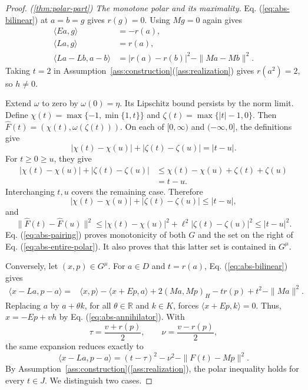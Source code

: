 \documentclass[11pt]{article}
\newcommand{\R}{\mathbb R}
\newcommand{\pair}[2]{\langle #1,#2\rangle}
\theoremstyle{definition}
\theoremstyle{remark}
\begin{document}
\begin{proof}
\noindent\textit{\textup{(\ref{thm:polar-part})} The monotone polar and its maximality.}
Eq. (\ref{eq:abs-bilinear}) at $a=b=g$ gives $r(g)=0$. Using $Mg=0$ again gives
\begin{equation}
\begin{aligned}
\pair{Ea}{g}&=-r(a),\\
\pair{La}{g}&=r(a),\\
\pair{La-Lb}{a-b}&=|r(a)-r(b)|^2-\|Ma-Mb\|^2.
\end{aligned}
\label{eq:abs-pairing}
\end{equation}
Taking $t=2$ in Assumption~\ref{ass:construction}\textup{(\ref{ass:realization})} gives $r(a^2)=2$, so $h\ne0$.

Extend $\omega$ to zero by $\omega(0)=\eta$. Its Lipschitz bound persists by the norm limit. Define $\chi(t)=\max\{-1,\min\{1,t\}\}$ and $\zeta(t)=\max\{|t|-1,0\}$. Then $\widehat F(t)=(\chi(t),\omega(\zeta(t)))$. On each of $[0,\infty)$ and $(-\infty,0]$, the definitions give
\[
|\chi(t)-\chi(u)|+|\zeta(t)-\zeta(u)|=|t-u|.
\]
For $t\ge0\ge u$, they give
\[
\begin{aligned}
|\chi(t)-\chi(u)|+|\zeta(t)-\zeta(u)|
&\le \chi(t)-\chi(u)+\zeta(t)+\zeta(u)\\
&=t-u.
\end{aligned}
\]
Interchanging $t,u$ covers the remaining case. Therefore
\[
|\chi(t)-\chi(u)|+|\zeta(t)-\zeta(u)|\le|t-u|,
\]
and
\[
\|\widehat F(t)-\widehat F(u)\|^2
\le|\chi(t)-\chi(u)|^2+\ell^2|\zeta(t)-\zeta(u)|^2
\le|t-u|^2.
\]
Eq. (\ref{eq:abs-pairing}) proves monotonicity of both $G$ and the set on the right of Eq. (\ref{eq:abs-entire-polar}). It also proves that this latter set is contained in $G^\mu$.

Conversely, let $(x,p)\in G^\mu$. For $a\in D$ and $t=r(a)$, Eq. (\ref{eq:abs-bilinear}) gives
\begin{align*}
\pair{x-La}{p-a}
={}&\pair{x}{p}-\pair{x+Ep}{a}
       +2(Ma,Mp)_H-t r(p)+t^2-\|Ma\|^2.
\end{align*}
Replacing $a$ by $a+\theta k$, for all $\theta\in\R$ and $k\in K$, forces $\pair{x+Ep}{k}=0$. Thus, $x=-Ep+v h$ by Eq. (\ref{eq:abs-annihilator}). With
\[
\tau=\frac{v+r(p)}2,\qquad \nu=\frac{v-r(p)}2,
\]
the same expansion reduces exactly to
\begin{equation}
\pair{x-La}{p-a}=(t-\tau)^2-\nu^2-\|F(t)-Mp\|^2.
\label{eq:abs-polar-square}
\end{equation}
By Assumption~\ref{ass:construction}\textup{(\ref{ass:realization})}, the polar inequality holds for every $t\in J$. We distinguish two cases.


\end{proof}
\end{document}
